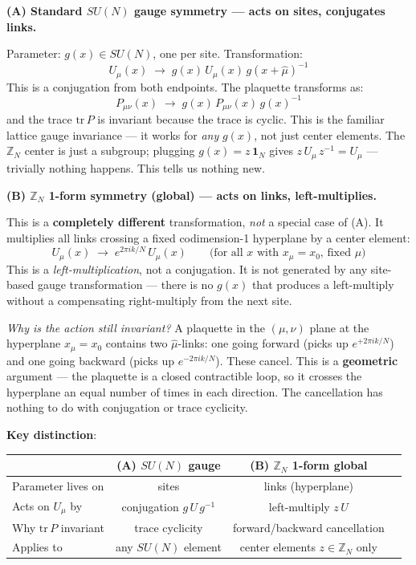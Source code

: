 \documentclass[12pt,a4paper]{article}
\begin{document}
\bigskip
\textbf{(A) Standard $SU(N)$ gauge symmetry --- acts on sites, conjugates links.}

Parameter: $g(x) \in SU(N)$, one per site. Transformation:
\begin{equation}
  U_\mu(x) \;\to\; g(x)\,U_\mu(x)\,g(x{+}\hat\mu)^{-1}
\end{equation}
This is a conjugation from both endpoints. The plaquette transforms as:
\begin{equation}
  P_{\mu\nu}(x) \;\to\; g(x)\,P_{\mu\nu}(x)\,g(x)^{-1}
\end{equation}
and the trace $\mathrm{tr}\,P$ is invariant because the trace is cyclic.
This is the familiar lattice gauge invariance --- it works for \emph{any} $g(x)$,
not just center elements. The $\mathbb{Z}_N$ center is just a subgroup; plugging
$g(x) = z\,\mathbf{1}_N$ gives $z\,U_\mu\,z^{-1} = U_\mu$ --- trivially nothing happens.
This tells us nothing new.

\bigskip
\textbf{(B) $\mathbb{Z}_N$ 1-form symmetry (global) --- acts on links, left-multiplies.}

This is a \textbf{completely different} transformation, \emph{not} a special case of (A).
It multiplies all links crossing a fixed codimension-1 hyperplane by a center element:
\begin{equation}
  U_\mu(x) \;\to\; e^{2\pi ik/N}\,U_\mu(x) \qquad
  \text{(for all $x$ with $x_\mu = x_0$, fixed $\mu$)}
\end{equation}
This is a \emph{left-multiplication}, not a conjugation.
It is not generated by any site-based gauge transformation --- there is no $g(x)$ that
produces a left-multiply without a compensating right-multiply from the next site.

\emph{Why is the action still invariant?}
A plaquette in the $(\mu,\nu)$ plane at the hyperplane $x_\mu = x_0$ contains
two $\hat\mu$-links: one going forward (picks up $e^{+2\pi ik/N}$) and one going backward
(picks up $e^{-2\pi ik/N}$). These cancel. This is a \textbf{geometric} argument ---
the plaquette is a closed contractible loop, so it crosses the hyperplane
an equal number of times in each direction. The cancellation has nothing to do with
conjugation or trace cyclicity.

\textbf{Key distinction}:
\begin{table}[H]
\centering
\begin{tabular}{|l|c|c|c|}
\hline
 & (A) $SU(N)$ gauge & (B) $\mathbb{Z}_N$ 1-form global \\
\hline
Parameter lives on & sites & links (hyperplane) \\
Acts on $U_\mu$ by & conjugation $g\,U\,g^{-1}$ & left-multiply $z\,U$ \\
Why $\mathrm{tr}\,P$ invariant & trace cyclicity & forward/backward cancellation \\
Applies to & any $SU(N)$ element & center elements $z \in \mathbb{Z}_N$ only \\
\hline
\end{tabular}
\end{table}
\end{document}
